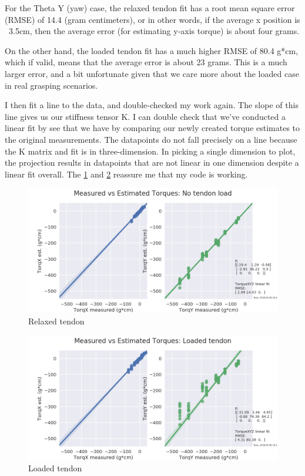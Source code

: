 \documentclass[preprint,12pt,3p]{elsarticle}
\begin{document}
For the Theta Y (yaw) case, the relaxed tendon fit has a root mean square error (RMSE) of 14.4 (gram
centimeters), or in other words, if the average x position is ~3.5cm, then the average error (for
estimating y-axis torque) is about four grams.

On the other hand, the loaded tendon fit has a much higher RMSE of 80.4 g*cm, which if valid, means
that the average error is about 23 grams. This is a much larger error, and a bit unfortunate given
that we care more about the loaded case in real grasping scenarios. 

I then fit a line to the data, and double-checked my work again. The slope of this line gives us our
stiffness tensor K. I can double check that we've conducted a linear fit by see that we have
by comparing our newly created torque estimates to the
original measurements. The datapoints do not fall precisely on a line because the K matrix and fit
is in three-dimension. In picking a single dimension to plot, the projection results in datapoints
that are not linear in one dimension despite a linear fit overall. The \cref{fig:sanity1} and
\cref{fig:sanity2} reassure me that my code is working. 

\begin{figure}[tb!]
\centering
\includegraphics[width=0.5\textheight]{images/stiff/torqsanity.png}
\caption{Relaxed tendon}
\label{fig:sanity1}
\end{figure}

\begin{figure}[tb!]
\centering
\includegraphics[width=0.5\textheight]{images/stiff/torqsanity_loaded.png}
\caption{Loaded tendon}
\label{fig:sanity2}
\end{figure}
\end{document}
